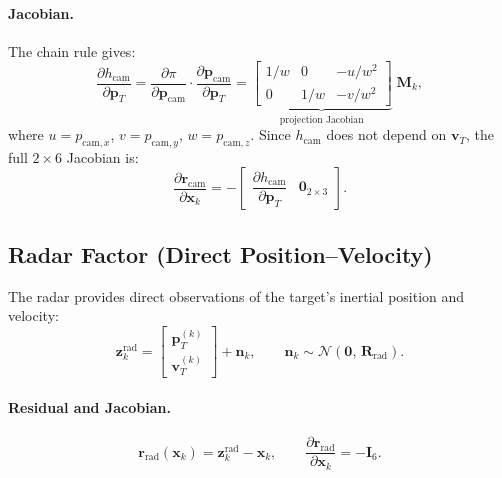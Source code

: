 \documentclass[11pt,a4paper]{article}
\newcommand{\state}{\bm{x}}
\newcommand{\meas}{\bm{z}}
\newcommand{\resid}{\bm{r}}
\newcommand{\eye}{\bm{I}}
\begin{document}
\paragraph{Jacobian.}
The chain rule gives:
\begin{equation}
  \frac{\partial h_{\text{cam}}}{\partial \bm{p}_T}
  = \frac{\partial \pi}{\partial \bm{p}_{\text{cam}}}
    \cdot \frac{\partial \bm{p}_{\text{cam}}}{\partial \bm{p}_T}
  = \underbrace{
    \begin{bmatrix}
      1/w & 0   & -u/w^2 \\
      0   & 1/w & -v/w^2
    \end{bmatrix}}_{\text{projection Jacobian}}
    \;\bm{M}_k,
  \label{eq:cam_jac}
\end{equation}
where $u = p_{\text{cam},x}$, $v = p_{\text{cam},y}$, $w =
p_{\text{cam},z}$.  Since $h_{\text{cam}}$ does not depend on
$\bm{v}_T$, the full $2\times 6$ Jacobian is:
\begin{equation}
  \frac{\partial \resid_{\text{cam}}}{\partial \state_k}
  = -\begin{bmatrix}
      \dfrac{\partial h_{\text{cam}}}{\partial \bm{p}_T} & \bm{0}_{2\times 3}
    \end{bmatrix}.
\end{equation}

\subsection{Radar Factor (Direct Position--Velocity)}
\label{sec:radar}

The radar provides direct observations of the target's inertial position
and velocity:
\begin{equation}
  \meas_k^{\text{rad}} = \begin{bmatrix} \bm{p}_T^{(k)} \\ \bm{v}_T^{(k)} \end{bmatrix}
  + \bm{n}_k,
  \qquad
  \bm{n}_k \sim \mathcal{N}(\bm{0},\, \bm{R}_{\text{rad}}).
\end{equation}

\paragraph{Residual and Jacobian.}
\begin{equation}
  \resid_{\text{rad}}(\state_k) = \meas_k^{\text{rad}} - \state_k,
  \qquad
  \frac{\partial \resid_{\text{rad}}}{\partial \state_k} = -\eye_6.
\end{equation}
\end{document}
